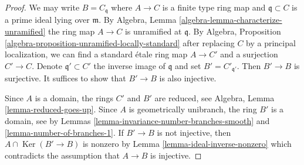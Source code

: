 \documentclass[10pt,a4paper]{amsart}
\theoremstyle{plain}
\theoremstyle{definition}
\theoremstyle{remark}
\numberwithin{equation}{subsection}
\def\Ker{\mathop{\mathrm{Ker}}}
\begin{document}
\begin{proof}
We may write $B = C_\mathfrak q$ where $A \to C$ is a finite
type ring map and $\mathfrak q \subset C$ is a prime ideal
lying over $\mathfrak m$. By
Algebra, Lemma \ref{algebra-lemma-characterize-unramified}
the ring map $A \to C$ is unramified at $\mathfrak q$.
By Algebra, Proposition \ref{algebra-proposition-unramified-locally-standard}
after replacing $C$ by a principal localization,
we can find a standard \'etale ring map $A \to C'$
and a surjection $C' \to C$. Denote $\mathfrak q' \subset C'$
the inverse image of $\mathfrak q$ and set $B' = C'_{\mathfrak q'}$.
Then $B' \to B$ is surjective.
It suffices to show that $B' \to B$ is also injective.

\medskip\noindent
Since $A$ is a domain, the rings $C'$ and $B'$ are reduced, see
Algebra, Lemma \ref{lemma-reduced-goes-up}.
Since $A$ is geometrically unibranch, the ring $B'$ is a domain, see
by Lemmas \ref{lemma-invariance-number-branches-smooth} and
\ref{lemma-number-of-branches-1}.
If $B' \to B$ is not injective, then
$A \cap \Ker(B' \to B)$ is nonzero by Lemma \ref{lemma-ideal-inverse-nonzero}
which contradicts the assumption that $A \to B$ is injective.
\end{proof}
\end{document}
